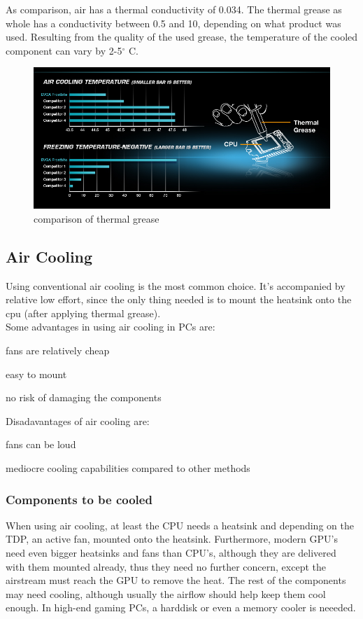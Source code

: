 As comparison, air has a thermal conductivity of 0.034. The thermal grease as whole has a conductivity between 0.5 and 10, depending on what product was used.
Resulting from the quality of the used grease, the temperature of the cooled component can vary by 2-5$^\circ$ C.

\begin{figure}[H]
  \centering
  \includegraphics[width=1\textwidth]{./graphics/evga_frostbite_grease}
  \caption{comparison of thermal grease}
  \label{fig:grease_comparison}
\end{figure}


\subsection{Air Cooling}
Using conventional air cooling is the most common choice. It's accompanied by relative low effort, since the only thing needed is to mount the heatsink onto the cpu (after applying thermal grease).\\
Some advantages in using air cooling in PCs are:
\begin{compactitem}
\item fans are relatively cheap
\item easy to mount
\item no risk of damaging the components\\
\end{compactitem}
Disadavantages of air cooling are:
\begin{compactitem}
  \item fans can be loud
  \item mediocre cooling capabilities compared to other methods\\
\end{compactitem}

\subsubsection{Components to be cooled}
When using air cooling, at least the CPU needs a heatsink and depending on the TDP, an active fan, mounted onto the heatsink. Furthermore, modern GPU's need even bigger
heatsinks and fans than CPU's, although they are delivered with them mounted already, thus they need no further concern, except the airstream must reach the GPU to remove the heat.
The rest of the components may need cooling, although usually the airflow should help keep them cool enough. In high-end gaming PCs, a harddisk or even a memory cooler is neeeded.


